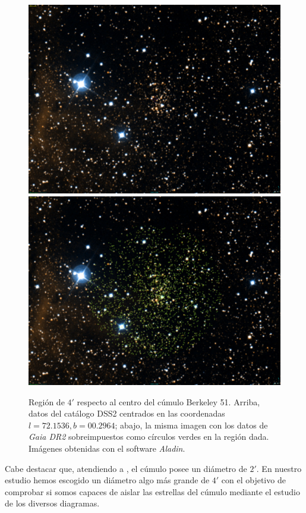 \documentclass[a4paper,fleqn,usenatbib]{mnras}
\begin{document}
\begin{figure}
  \centering
  \includegraphics[width=\linewidth]{img/cumulo_berkeley}
  \includegraphics[width=\linewidth]{img/cumulo_berkeley_gaia}
  \caption{Región de $4'$ respecto al centro del cúmulo Berkeley 51. Arriba, datos del catálogo \ac{DSS2} centrados en las coordenadas $l=72.1536, b=00.2964$; abajo, la misma imagen con los datos de \emph{Gaia DR2} sobreimpuestos como círculos verdes en la región dada. Imágenes obtenidas con el software \emph{Aladin}.}
  \label{fig:e2_b51}
\end{figure}

Cabe destacar que, atendiendo a \cite{Tadross2008}, el cúmulo posee un diámetro de $2'$. En nuestro estudio hemos escogido un diámetro algo más grande de $4'$ con el objetivo de comprobar si somos capaces de aislar las estrellas del cúmulo mediante el estudio de los diversos diagramas.
\end{document}
